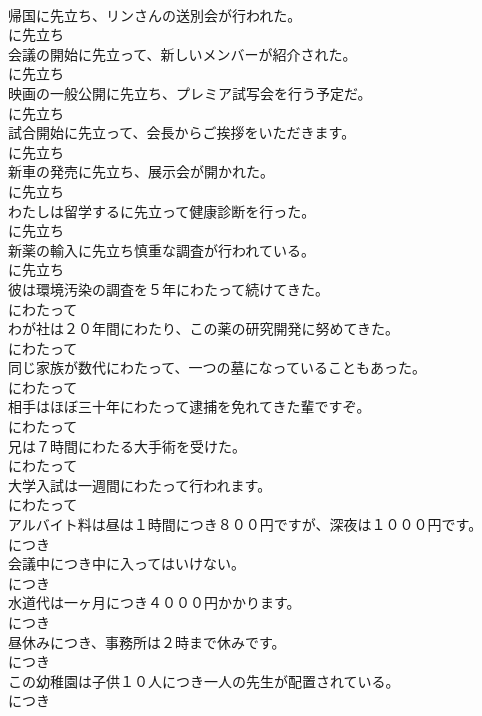 \documentclass[8pt]{extreport}
\begin{document}
\begin{CJK}{UTF8}{min}
\\	帰国に先立ち、リンさんの送別会が行われた。	
\\	に先立ち	
\\	会議の開始に先立って、新しいメンバーが紹介された。	
\\	に先立ち	
\\	映画の一般公開に先立ち、プレミア試写会を行う予定だ。	
\\	に先立ち	
\\	試合開始に先立って、会長からご挨拶をいただきます。	
\\	に先立ち	
\\	新車の発売に先立ち、展示会が開かれた。	
\\	に先立ち	
\\	わたしは留学するに先立って健康診断を行った。	
\\	に先立ち	
\\	新薬の輸入に先立ち慎重な調査が行われている。	
\\	に先立ち	
\\	彼は環境汚染の調査を５年にわたって続けてきた。	
\\	にわたって	
\\	わが社は２０年間にわたり、この薬の研究開発に努めてきた。	
\\	にわたって	
\\	同じ家族が数代にわたって、一つの墓になっていることもあった。	
\\	にわたって	
\\	相手はほぼ三十年にわたって逮捕を免れてきた輩ですぞ。	
\\	にわたって	
\\	兄は７時間にわたる大手術を受けた。	
\\	にわたって	
\\	大学入試は一週間にわたって行われます。	
\\	にわたって	
\\	アルバイト料は昼は１時間につき８００円ですが、深夜は１０００円です。	
\\	につき	
\\	会議中につき中に入ってはいけない。	
\\	につき	
\\	水道代は一ヶ月につき４０００円かかります。	
\\	につき	
\\	昼休みにつき、事務所は２時まで休みです。	
\\	につき	
\\	この幼稚園は子供１０人につき一人の先生が配置されている。	
\\	につき	

\end{CJK}
\end{document}

